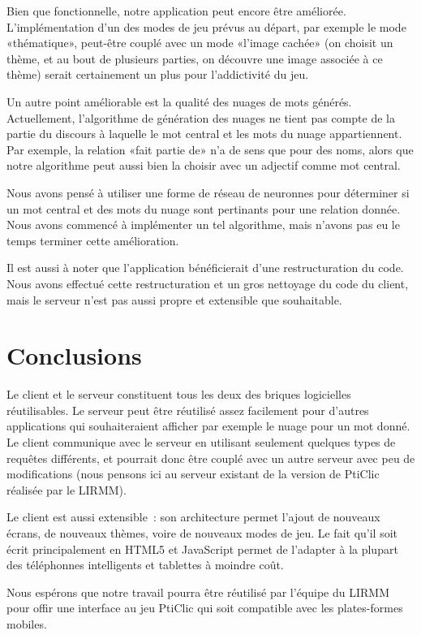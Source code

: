 \documentclass[a4paper,11pt,french]{article}
\begin{document}
{Bien que fonctionnelle, notre application peut encore être améliorée. L'implémentation d'un des modes de jeu prévus au départ, par exemple
le mode «thématique», peut-être couplé avec un mode «l'image cachée» (on choisit un thème, et au bout de plusieurs parties, on découvre une
image associée à ce thème) serait certainement un plus pour l'addictivité du jeu.

Un autre point améliorable est la qualité des nuages de mots générés. Actuellement, l'algorithme de génération des nuages ne tient pas
compte de la partie du discours à laquelle le mot central et les mots du nuage appartiennent. Par exemple, la relation «fait partie de» n'a
de sens que pour des noms, alors que notre algorithme peut aussi bien la choisir avec un adjectif comme mot central.

Nous avons pensé à utiliser une forme de réseau de neuronnes pour déterminer si un mot central et des mots du nuage sont pertinants pour une
relation donnée. Nous avons commencé à implémenter un tel algorithme, mais n'avons pas eu le temps terminer cette amélioration.

Il est aussi à noter que l'application bénéficierait d'une restructuration du code. Nous avons effectué cette restructuration et un gros
nettoyage du code du client, mais le serveur n'est pas aussi propre et extensible que souhaitable.

\section{Conclusions}

Le client et le serveur constituent tous les deux des briques logicielles réutilisables. Le serveur peut être réutilisé assez facilement
pour d'autres applications qui souhaiteraient afficher par exemple le nuage pour un mot donné. Le client communique avec le serveur en
utilisant seulement quelques types de requêtes différents, et pourrait donc être couplé avec un autre serveur avec peu de modifications
(nous pensons ici au serveur existant de la version de PtiClic réalisée par le LIRMM).

Le client est aussi extensible~: son architecture permet l'ajout de nouveaux écrans, de nouveaux thèmes, voire de nouveaux modes de jeu. Le
fait qu'il soit écrit principalement en HTML5 et JavaScript permet de l'adapter à la plupart des téléphonnes intelligents et tablettes à
moindre coût.

Nous espérons que notre travail pourra être réutilisé par l'équipe du LIRMM pour offir une interface au jeu PtiClic qui soit compatible avec
les plates-formes mobiles.

}
\end{document}

